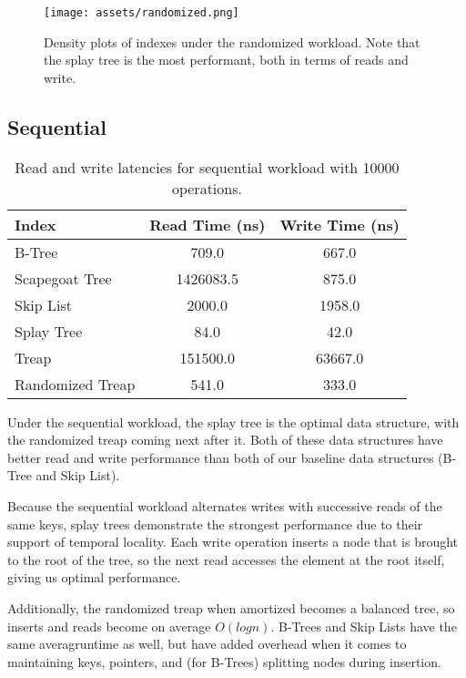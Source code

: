 \documentclass[sigconf]{acmart}
\begin{document}
\begin{center}
  \begin{figure}[H]
    \texttt{[image: assets/randomized.png]}
    \caption{Density plots of indexes under the randomized workload. Note that the splay tree is the most performant, both in terms of reads and write.}
  \end{figure}
\end{center}
\newpage

\subsection{Sequential}
\begin{center}
  \begin{table}[H]
    \begin{tabular}{|l|c|c|}
      \hline
      \bf{Index} & \bf{Read Time (ns)} & \bf{Write Time (ns)} \\
      \hline
      B-Tree&709.0&667.0\\
      \hline
      Scapegoat Tree&1426083.5&875.0\\
      \hline
      Skip List&2000.0&1958.0\\
      \hline
      Splay Tree&84.0&42.0\\
      \hline
      Treap&151500.0&63667.0\\
      \hline
      Randomized Treap&541.0&333.0\\
      \hline
    \end{tabular}
    \caption{Read and write latencies for sequential workload with 10000 operations.}
  \end{table}
\end{center}

Under the sequential workload, the splay tree is the optimal data structure, with the randomized treap coming next after it. Both of these data structures have better read and write performance than both of our baseline data structures (B-Tree and Skip List).

Because the sequential workload alternates writes with successive reads of the same keys, splay trees demonstrate the strongest performance due to their support of temporal locality. Each write operation inserts a node that is brought to the root of the tree, so the next read accesses the element at the root itself, giving us optimal performance.

Additionally, the randomized treap when amortized becomes a balanced tree, so inserts and reads become on average $O(logn)$. B-Trees and Skip Lists have the same averagruntime as well, but have added overhead when it comes to maintaining keys, pointers, and (for B-Trees) splitting nodes during insertion. 
\end{document}

